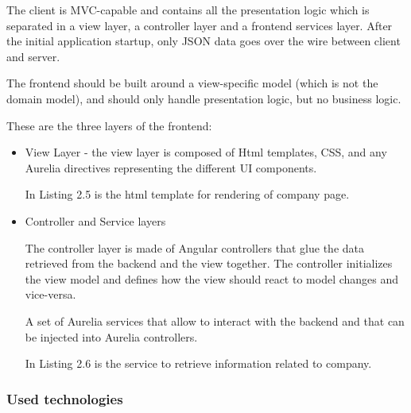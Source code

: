 \documentclass[12pt,a4paper,titlepage]{article}
\begin{document}
The client is MVC-capable and contains all the presentation logic which is separated in a view layer, a controller layer and a frontend services layer. After the initial application startup, only JSON data goes over the wire between client and server.

The frontend should be built around a view-specific model (which is not the domain model), and should only handle presentation logic, but no business logic.

These are the three layers of the frontend:
\begin{itemize}
\item View Layer - the view layer is composed of Html templates, CSS, and any Aurelia directives representing the different UI components.

In Listing 2.5 is the html template for rendering of company page.



\item Controller and Service layers

The controller layer is made of Angular controllers that glue the data retrieved from the backend and the view together. The controller initializes the view model and defines how the view should react to model changes and vice-versa. 

A set of Aurelia services that allow to interact with the backend and that can be injected into Aurelia controllers.

In Listing 2.6 is the service to retrieve information related to company.




\end{itemize}

\subsubsection{Used technologies}
\end{document}
